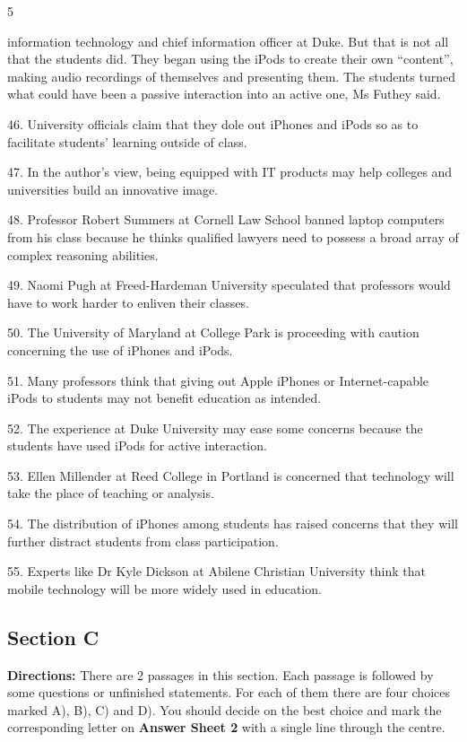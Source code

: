 \documentclass[UTF8,11pt]{ctexart}
\begin{document}
5


information technology and chief information officer at Duke. But that is not all that the students did. They began using the iPods to create their own “content”, making audio recordings of themselves and presenting them. The students turned what could have been a passive interaction into an active one, Ms Futhey said.


46. University officials claim that they dole out iPhones and iPods so as to facilitate students’ learning outside of class.


47. In the author’s view, being equipped with IT products may help colleges and universities build an innovative image.


48. Professor Robert Summers at Cornell Law School banned laptop computers from his class because he thinks qualified lawyers need to possess a broad array of complex reasoning abilities.


49. Naomi Pugh at Freed-Hardeman University speculated that professors would have to work harder to enliven their classes.


50. The University of Maryland at College Park is proceeding with caution concerning the use of iPhones and iPods.


51. Many professors think that giving out Apple iPhones or Internet-capable iPods to students may not benefit education as intended.


52. The experience at Duke University may ease some concerns because the students have used iPods for active interaction.


53. Ellen Millender at Reed College in Portland is concerned that technology will take the place of teaching or analysis.


54. The distribution of iPhones among students has raised concerns that they will further distract students from class participation.


55. Experts like Dr Kyle Dickson at Abilene Christian University think that mobile technology will be more widely used in education.


\subsection*{\textbf{Section C}}


\textbf{Directions:} There are 2 passages in this section. Each passage is followed by some questions or unfinished statements. For each of them there are four choices marked A), B), C) and D). You should decide on the best choice and mark the corresponding letter on\textbf{ Answer Sheet 2} with a single line through the centre.
\end{document}
